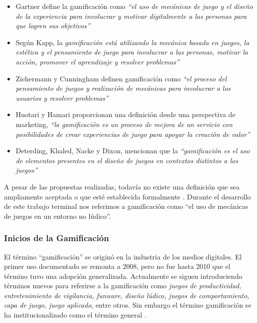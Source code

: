     \begin{itemize}

        \item Gartner define la gamificación como {\it ``el uso de mecánicas de juego y 
        el diseño de la experiencia para involucrar y motivar digitalmente a las personas para 
        que logren sus objetivos''} \cite{Burke}
        
        \item Según Kapp, la {\it gamificación está utilizando la mecánica basada en juegos, 
        la estética y el pensamiento de juego para involucrar a las personas, motivar la acción, 
        promover el aprendizaje y resolver problemas''} \cite{Kapp}
        
        \item Zichermann y Cunningham definen gamificación como {\it ``el proceso del 
        pensamiento de juegos y realización de mecánicas para involucrar a los usuarios y resolver 
        problemas''} \cite{GamByDesign} %
        
        \item Huotari y Hamari proporcionan una definición desde una perspectiva de marketing,
        {\it ``la gamificación es un proceso de mejora de un servicio con posibilidades de crear
        experiencias de juego para apoyar la creación de valor''} \cite{Huotari}  %
        
        \item Deterding, Khaled, Nacke y Dixon, mencionan que la {\it ``gamificación
        es el uso de elementos presentes en el diseño de juegos en contextos distintos a
        los juegos''} \cite{DeterdingDefinition} %
    
    \end{itemize}

 \noindent A pesar de las propuestas realizadas, todavía no existe una definición que sea ampliamente aceptada o que esté establecida formalmente \cite{Seaborn}. Durante el desarrollo de este trabajo terminal nos referimos a gamificación como ``el uso de mecánicas de juegos en un entorno no lúdico''.

\subsubsection{Inicios de la Gamificación}

 El término ``gamificación'' se originó en la industria de los medios digitales. El primer uso documentado se remonta a 2008, pero no fue hasta 2010 que el término tuvo una adopción generalizada. Actualmente se siguen introduciendo términos nuevos para referirse a la gamificación como {\it juegos de productividad, entretenimiento de vigilancia, funware, diseño lúdico, juegos de comportamiento, capa de juego, juego aplicado}, entre otros. Sin embargo el término gamificación se ha institucionalizado como el término general \cite{DeterdingGamefulness}.\\
    
